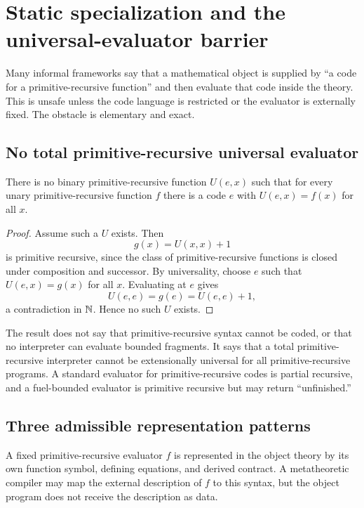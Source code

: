 \section{Static specialization and the universal-evaluator barrier}
\label{sec:static}

Many informal frameworks say that a mathematical object is supplied by ``a code for a
primitive-recursive function'' and then evaluate that code inside the theory.  This is
unsafe unless the code language is restricted or the evaluator is externally fixed.
The obstacle is elementary and exact.

\subsection{No total primitive-recursive universal evaluator}

\begin{barrier}
\label{barrier:no-universal-pr}
There is no binary primitive-recursive function \(U(e,x)\) such that for every unary
primitive-recursive function \(f\) there is a code \(e\) with
\(U(e,x)=f(x)\) for all \(x\).
\end{barrier}

\begin{proof}
Assume such a \(U\) exists.  Then
\[
    g(x)=U(x,x)+1
\]
is primitive recursive, since the class of primitive-recursive functions is closed
under composition and successor.  By universality, choose \(e\) such that
\(U(e,x)=g(x)\) for all \(x\).  Evaluating at \(e\) gives
\[
    U(e,e)=g(e)=U(e,e)+1,
\]
a contradiction in \(\mathbb N\).  Hence no such \(U\) exists.
\end{proof}

The result does not say that primitive-recursive syntax cannot be coded, or that no
interpreter can evaluate bounded fragments.  It says that a total primitive-recursive
interpreter cannot be extensionally universal for all primitive-recursive programs.
A standard evaluator for primitive-recursive codes is partial recursive, and a
fuel-bounded evaluator is primitive recursive but may return ``unfinished.''

\subsection{Three admissible representation patterns}

\begin{definition}
A fixed primitive-recursive evaluator \(f\) is represented in the object theory by its
own function symbol, defining equations, and derived contract.  A metatheoretic
compiler may map the external description of \(f\) to this syntax, but the object
program does not receive the description as data.
\end{definition}

